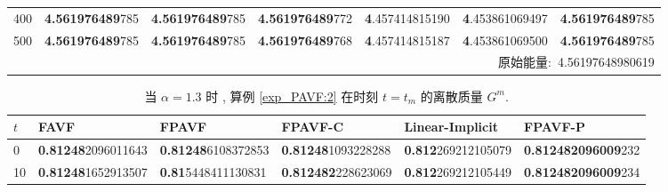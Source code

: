 \begin{table}[H]
\begin{tabular}{lllllll}
	400   &\textbf{4.561976489}785   &\textbf{4.561976489}785   &\textbf{4.561976489}772   &\textbf{4}.457414815190   &\textbf{4}.453861069497   &\textbf{4.561976489}785 \\
	500   &\textbf{4.561976489}785   &\textbf{4.561976489}785   &\textbf{4.561976489}768   &\textbf{4}.457414815187   &\textbf{4}.453861069500   &\textbf{4.561976489}785 \\
	\midrule
	  \multicolumn{7}{r}{原始能量:~4.56197648980619} \\
	  \bottomrule
	  \end{tabular}\label{tab_PAVF:1}%
  \end{table}%


\begin{table}[H]\footnotesize
	\centering
	\caption{当 $\alpha=1.3$ 时 , 算例 \ref{exp_PAVF:2}  在时刻 $t=t_{m}$ 的离散质量 $G^{m}$.}
	  \begin{tabular}{llllll}
	  \toprule
$t$   &FAVF   &FPAVF   &FPAVF-C   &Linear-Implicit   &FPAVF-P\\
	\midrule
	0     &\textbf{0.81248}2096011643   &\textbf{0.81248}6108372853   &\textbf{0.81248}1093228288   &\textbf{0.812}269212105079   &\textbf{0.812482096009}232 \\
	10    &\textbf{0.81248}1652913507   &\textbf{0.81}5448411130831   &\textbf{0.812482}228623069   &\textbf{0.812}269212105449   &\textbf{0.812482096009}234 \\

\end{tabular}
\end{table}
